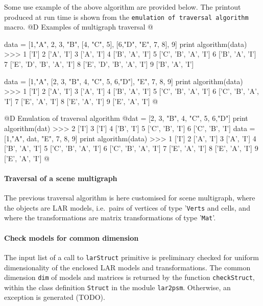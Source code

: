 \documentclass[11pt,oneside]{article}    %
\begin{document}
Some use example of the above algorithm are provided below. The printout produced at run time is shown from the \texttt{emulation of traversal algorithm} macro.
@D Examples of multigraph traversal
@{data = [1,"A", 2, 3, "B", [4, "C", 5], [6,"D", "E", 7, 8], 9]  
print algorithm(data)
>>> 1 ['I']
    2 ['A', 'I']
    3 ['A', 'I']
    4 ['B', 'A', 'I']
    5 ['C', 'B', 'A', 'I']
    6 ['B', 'A', 'I']
    7 ['E', 'D', 'B', 'A', 'I']
    8 ['E', 'D', 'B', 'A', 'I']
    9 ['B', 'A', 'I']

data = [1,"A", [2, 3, "B", 4, "C", 5, 6,"D"], "E", 7, 8, 9]  
print algorithm(data)
>>> 1 ['I']
    2 ['A', 'I']
    3 ['A', 'I']
    4 ['B', 'A', 'I']
    5 ['C', 'B', 'A', 'I']
    6 ['C', 'B', 'A', 'I']
    7 ['E', 'A', 'I']
    8 ['E', 'A', 'I']
    9 ['E', 'A', 'I']
@}
@D Emulation of traversal algorithm
@{dat = [2, 3, "B", 4, "C", 5, 6,"D"]
print algorithm(dat)
>>> 2 ['I']
    3 ['I']
    4 ['B', 'I']
    5 ['C', 'B', 'I']
    6 ['C', 'B', 'I']
data = [1,"A", dat, "E", 7, 8, 9]
print algorithm(data)
>>> 1 ['I']
    2 ['A', 'I']
    3 ['A', 'I']
    4 ['B', 'A', 'I']
    5 ['C', 'B', 'A', 'I']
    6 ['C', 'B', 'A', 'I']
    7 ['E', 'A', 'I']
    8 ['E', 'A', 'I']
    9 ['E', 'A', 'I']
@}

\paragraph{Traversal of a scene multigraph}

The previous traversal algorithm is here customised for scene multigraph, where the objects are LAR models, i.e.~pairs of vertices of type '\texttt{Verts} and cells, and where the transformations are matrix transformations of type '\texttt{Mat}'.

\paragraph{Check models for common dimension}
The input list of a call to \texttt{larStruct} primitive is preliminary checked for uniform dimensionality of the enclosed LAR models and transformations. The common dimension \texttt{dim} of models and matrices is returned by the function \texttt{checkStruct}, within the class definition \texttt{Struct} in the module \texttt{lar2psm}. Otherwise, an exception is generated (TODO).
\end{document}
